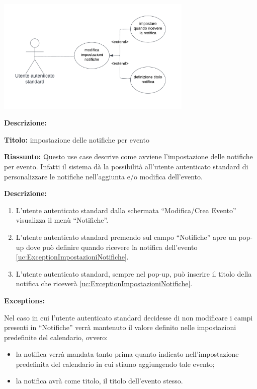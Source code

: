\begin{listaPersonale}[UC]{}





    \newpage


    \begin{center}
        \includegraphics[width=0.7\textwidth]{img/Diagrammi/UseCases/Notifiche.png}
    \end{center}

    \textbf{Descrizione:}

    \textbf{Titolo:} impostazione delle notifiche per evento

    \textbf{Riassunto:}
    Questo use case descrive come avviene l'impostazione delle notifiche per evento. Infatti il sistema dà la possibilità all'utente autenticato standard di personalizzare le notifiche nell'aggiunta e/o modifica dell'evento.

    \textbf{Descrizione:}
    \begin{enumerate}
        \item L'utente autenticato standard dalla schermata “Modifica/Crea Evento” visualizza il menù “Notifiche”.
        \item L'utente autenticato standard premendo sul campo “Notifiche” apre un pop-up dove può definire quando ricevere la notifica dell'evento \ref{uc:ExceptionImpostazioniNotifiche}.
        \item L'utente autenticato standard, sempre nel pop-up, può inserire il titolo della notifica che riceverà \ref{uc:ExceptionImpostazioniNotifiche}.
    \end{enumerate}

    \textbf{Exceptions:}
    \begin{enumerate}[label=\textbf{[exception \arabic{enumii}]}, ref= \textbf{[exception \arabic{enumii}]}]
         Nel caso in cui l'utente autenticato standard decidesse di non modificare i campi presenti in “Notifiche” verrà mantenuto il valore definito nelle impostazioni predefinite del calendario, ovvero:
        \begin{itemize}
            \item la notifica verrà mandata tanto prima quanto indicato nell'impostazione predefinita del calendario in cui stiamo aggiungendo tale evento;
            \item la notifica avrà come titolo, il titolo dell'evento stesso.
        \end{itemize}
    \end{enumerate}



\end{listaPersonale}
